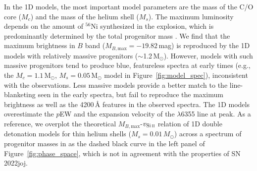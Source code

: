 \documentclass[twocolumn]{aastex631}
\newcommand{\sn}{SN\,2022joj}
\begin{document}
\begin{CJK*}{UTF8}{gbsn}
In the 1D models, the most important model parameters are the mass of the C/O core ($M_c$) and the mass of the helium shell ($M_s$). The maximum luminosity depends on the amount of $^{56}$Ni synthesized in the explosion, which is predominantly determined by the total progenitor mass \citep[$M_c+M_s$;][]{polin_observational_2019}. We find that the maximum brightness in $B$ band ($M_{B,\mathrm{max}}=-19.82$\,mag) is reproduced by the 1D models with relatively massive progenitors ($\sim$1.2\,$\mathrm{M_\odot}$). However, models with such massive progenitors tend to produce blue, featureless spectra at early times (e.g., the $M_c=1.1\,\mathrm{M_\odot}$, $M_s=0.05\,\mathrm{M_\odot}$ model in Figure~\ref{fig:model_spec}), inconsistent with the observations. Less massive models provide a better match to the line-blanketing seen in the early spectra, but fail to reproduce the maximum brightness as well as the 4200\,\r{A} features in the observed spectra. The 1D models overestimate the $p$EW and the expansion velocity of the  $\lambda$6355 line at peak. As a reference, we overplot the theoretical $M_{B,\mathrm{max}}$-$v_\mathrm{Si\,\textsc{ii}}$ relation of 1D double detonation models for thin helium shells ($M_s = 0.01\,M_\odot$) across a spectrum of progenitor masses in \citet{polin_observational_2019} as the dashed black curve in the left panel of Figure~\ref{fig:phase_space}, which is not in agreement with the properties of \sn.


\end{CJK*}
\end{document}
